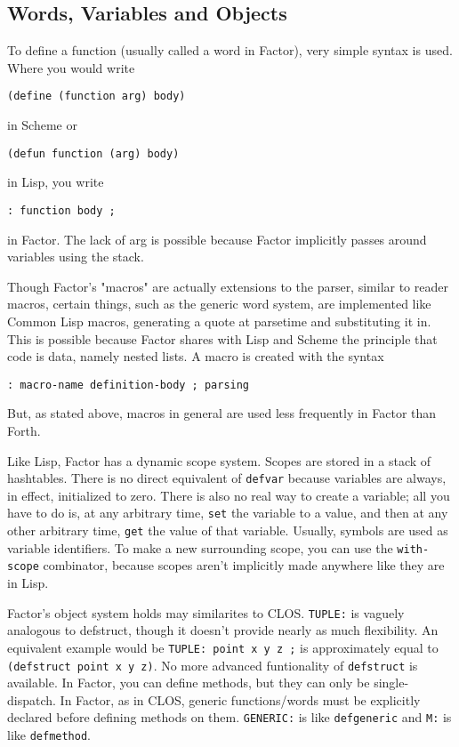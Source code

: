 \documentclass{article}
\begin{document}
\subsection{Words, Variables and Objects}

To define a function (usually called a word in Factor), very simple syntax is used. Where you would write
\begin{verbatim}
(define (function arg) body)
\end{verbatim}
in Scheme or
\begin{verbatim}
(defun function (arg) body)
\end{verbatim}
in Lisp, you write
\begin{verbatim}
: function body ;
\end{verbatim}
in Factor. The lack of arg is possible because Factor implicitly passes around variables using the stack.

Though Factor's "macros" are actually extensions to the parser, similar to reader macros, certain things, such as the generic word system, are implemented like Common Lisp macros, generating a quote at parsetime and substituting it in. This is possible because Factor shares with Lisp and Scheme the principle that code is data, namely nested lists. A macro is created with the syntax
\begin{verbatim}
: macro-name definition-body ; parsing
\end{verbatim}
But, as stated above, macros in general are used less frequently in Factor than Forth.

Like Lisp, Factor has a dynamic scope system. Scopes are stored in a stack of hashtables. There is no direct equivalent of \texttt{defvar} because variables are always, in effect, initialized to zero. There is also no real way to create a variable; all you have to do is, at any arbitrary time, \texttt{set} the variable to a value, and then at any other arbitrary time, \texttt{get} the value of that variable. Usually, symbols are used as variable identifiers. To make a new surrounding scope, you can use the \texttt{with-scope} combinator, because scopes aren't implicitly made anywhere like they are in Lisp.

Factor's object system holds may similarites to CLOS. \texttt{TUPLE:} is vaguely analogous to defstruct, though it doesn't provide nearly as much flexibility. An equivalent example would be \verb|TUPLE: point x y z ;| is approximately equal to \verb|(defstruct point x y z)|. No more advanced funtionality of \texttt{defstruct} is available. In Factor, you can define methods, but they can only be single-dispatch. In Factor, as in CLOS, generic functions/words must be explicitly declared before defining methods on them. \texttt{GENERIC:} is like \texttt{defgeneric} and \texttt{M:} is like \texttt{defmethod}.
\end{document}
